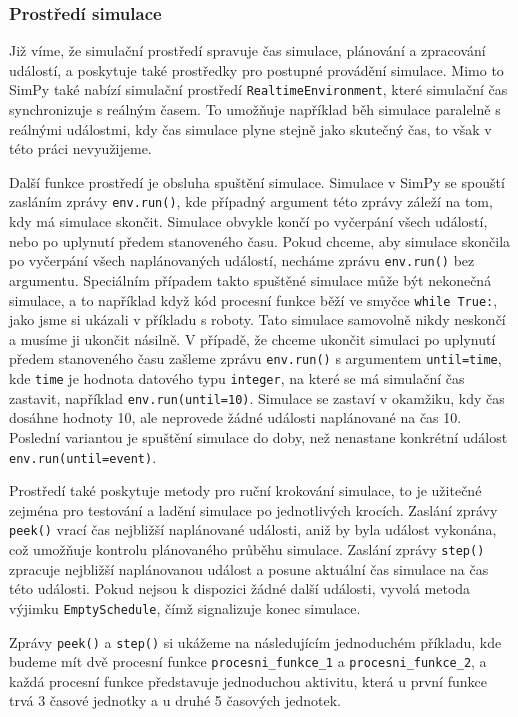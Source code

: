 \documentclass[12pt,a4paper]{article}
\begin{document}
\subsubsection{Prostředí simulace}
Již víme, že simulační prostředí spravuje čas simulace, plánování a zpracování událostí, a poskytuje také prostředky pro postupné provádění simulace. Mimo to SimPy také nabízí simulační prostředí \texttt{RealtimeEnvironment}, které simulační čas synchronizuje s reálným časem. To umožňuje například běh simulace paralelně s reálnými událostmi, kdy čas simulace plyne stejně jako skutečný čas, to však v této práci nevyužijeme.

Další funkce prostředí je obsluha spuštění simulace. Simulace v SimPy se spouští zasláním zprávy \texttt{env.run()}, kde případný argument této zprávy záleží na tom, kdy má simulace skončit. Simulace obvykle končí po vyčerpání všech událostí, nebo po uplynutí předem stanoveného času. Pokud chceme, aby simulace skončila po vyčerpání všech naplánovaných událostí, necháme zprávu \texttt{env.run()} bez argumentu. Speciálním případem takto spuštěné simulace může být nekonečná simulace, a to například když kód procesní funkce běží ve smyčce \texttt{while True:}, jako jsme si ukázali v příkladu s roboty. Tato simulace samovolně nikdy neskončí a musíme ji ukončit násilně.
V případě, že chceme ukončit simulaci po uplynutí předem stanoveného času zašleme zprávu \texttt{env.run()} s argumentem \texttt{until=time}, kde \texttt{time} je hodnota datového typu \texttt{integer}, na které se má simulační čas zastavit, například \texttt{env.run(until=10)}. Simulace se zastaví v okamžiku, kdy čas dosáhne hodnoty 10, ale neprovede žádné události naplánované na čas 10. Poslední variantou je spuštění simulace do doby, než nenastane konkrétní událost \texttt{env.run(until=event)}. 

Prostředí také poskytuje metody pro ruční krokování simulace, to je užitečné zejména pro testování a ladění simulace po jednotlivých krocích. Zaslání zprávy \texttt{peek()} vrací čas nejbližší naplánované události, aniž by byla událost vykonána, což umožňuje kontrolu plánovaného průběhu simulace. Zaslání zprávy \texttt{step()} zpracuje nejbližší naplánovanou událost a posune aktuální čas simulace na čas této události. Pokud nejsou k dispozici žádné další události, vyvolá metoda výjimku \texttt{EmptySchedule}, čímž signalizuje konec simulace. 

Zprávy \texttt{peek()} a \texttt{step()} si ukážeme na následujícím jednoduchém příkladu, kde budeme mít dvě procesní funkce \texttt{procesni\_funkce\_1} a \texttt{procesni\_funkce\_2}, a každá procesní funkce představuje jednoduchou aktivitu, která u první funkce trvá 3 časové jednotky a u druhé 5 časových jednotek.
\end{document}
